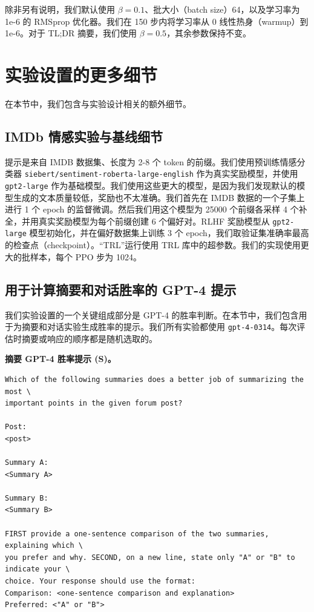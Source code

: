 \documentclass[11pt,UTF8,fontset=fandol]{ctexart}
\begin{document}
除非另有说明，我们默认使用 $\beta = 0.1$、批大小（batch size）64，以及学习率为 1e-6 的 RMSprop 优化器。我们在 150 步内将学习率从 0 线性热身（warmup）到 1e-6。对于 TL;DR 摘要，我们使用 $\beta = 0.5$，其余参数保持不变。

\section{实验设置的更多细节}

在本节中，我们包含与实验设计相关的额外细节。

\subsection{IMDb 情感实验与基线细节}

提示是来自 IMDB 数据集、长度为 2-8 个 token 的前缀。我们使用预训练情感分类器 \texttt{siebert/\allowbreak sentiment-\allowbreak roberta-\allowbreak large-\allowbreak english} 作为真实奖励模型，并使用 \texttt{gpt2-large} 作为基础模型。我们使用这些更大的模型，是因为我们发现默认的模型生成的文本质量较低，奖励也不太准确。我们首先在 IMDB 数据的一个子集上进行 1 个 epoch 的监督微调。然后我们用这个模型为 25000 个前缀各采样 4 个补全，并用真实奖励模型为每个前缀创建 6 个偏好对。RLHF 奖励模型从 \texttt{gpt2-large} 模型初始化，并在偏好数据集上训练 3 个 epoch，我们取验证集准确率最高的检查点（checkpoint）。“TRL”运行使用 TRL 库中的超参数。我们的实现使用更大的批样本，每个 PPO 步为 1024。

\subsection{用于计算摘要和对话胜率的 GPT-4 提示}

我们实验设置的一个关键组成部分是 GPT-4 的胜率判断。在本节中，我们包含用于为摘要和对话实验生成胜率的提示。我们所有实验都使用 \texttt{gpt-4-0314}。每次评估时摘要或响应的顺序都是随机选取的。

\textbf{摘要 GPT-4 胜率提示 (S)。}
\begin{lstlisting}
Which of the following summaries does a better job of summarizing the most \
important points in the given forum post?

Post:
<post>

Summary A:
<Summary A>

Summary B:
<Summary B>

FIRST provide a one-sentence comparison of the two summaries, explaining which \
you prefer and why. SECOND, on a new line, state only "A" or "B" to indicate your \
choice. Your response should use the format:
Comparison: <one-sentence comparison and explanation>
Preferred: <"A" or "B">
\end{lstlisting}
\end{document}
